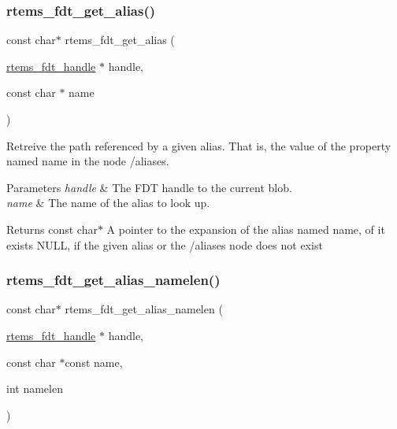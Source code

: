 \subsubsection{\texorpdfstring{rtems\_fdt\_get\_alias()}{rtems\_fdt\_get\_alias()}}
{\footnotesize\ttfamily const char$\ast$ rtems\+\_\+fdt\+\_\+get\+\_\+alias (\begin{DoxyParamCaption}\item[{\mbox{\hyperlink{structrtems__fdt__handle}{rtems\+\_\+fdt\+\_\+handle}} $\ast$}]{handle,  }\item[{const char $\ast$}]{name }\end{DoxyParamCaption})}

Retreive the path referenced by a given alias. That is, the value of the property named \textquotesingle{}name\textquotesingle{} in the node /aliases.


\begin{DoxyParams}{Parameters}
{\em handle} & The F\+DT handle to the current blob. \\
\hline
{\em name} & The name of the alias to look up. \\
\hline
\end{DoxyParams}
\begin{DoxyReturn}{Returns}
const char$\ast$ A pointer to the expansion of the alias named \textquotesingle{}name\textquotesingle{}, of it exists N\+U\+LL, if the given alias or the /aliases node does not exist 
\end{DoxyReturn}
\mbox{\label{rtems-fdt_8h_a424bf49f7d9b45ac4340206aef66c8f4}} 
\subsubsection{\texorpdfstring{rtems\_fdt\_get\_alias\_namelen()}{rtems\_fdt\_get\_alias\_namelen()}}
{\footnotesize\ttfamily const char$\ast$ rtems\+\_\+fdt\+\_\+get\+\_\+alias\+\_\+namelen (\begin{DoxyParamCaption}\item[{\mbox{\hyperlink{structrtems__fdt__handle}{rtems\+\_\+fdt\+\_\+handle}} $\ast$}]{handle,  }\item[{const char $\ast$const}]{name,  }\item[{int}]{namelen }\end{DoxyParamCaption})}

